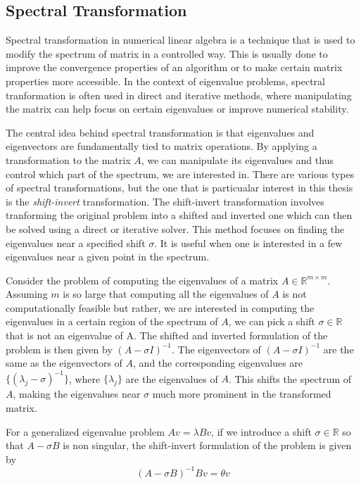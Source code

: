 \subsection{Spectral Transformation}
Spectral transformation in numerical linear algebra is a technique that is used to modify the spectrum of matrix in a controlled way. This is usually done to improve the convergence properties of an algorithm or to make certain matrix properties more accessible. In the context of eigenvalue problems, spectral tranformation is often used in direct and iterative methods, where manipulating the matrix can help focus on certain eigenvalues or improve numerical stability.\par
The central idea behind spectral transformation is that eigenvalues and eigenvectors are fundamentally tied to matrix operations. By applying a transformation to the matrix $A$, we can manipulate its eigenvalues and thus control which part of the spectrum, we are interested in. There are various types of spectral transformations, but the one that is particualar interest in this thesis is the \textit{shift-invert} transformation. The shift-invert transformation involves tranforming the original problem into a shifted and inverted one which can then be solved using a direct or iterative solver. This method focuses on finding the eigenvalues near a specified shift $\sigma$. It is useful when one is interested in a few eigenvalues near a given point in the spectrum.\par
Consider the problem of computing the eigenvalues of a matrix $A \in \mathbb{R}^{m \times m}$. Assuming $m$ is so large that computing all the eigenvalues of $A$ is not computationally feasible but rather, we are interested in computing the eigenvalues in a certain region of the spectrum of $A$, we can pick a shift $\sigma \in \mathbb{R}$ that is not an eigenvalue of A. The shifted and inverted formulation of the problem is then given by $(A - \sigma I)^{-1}$. The eigenvectors of $(A - \sigma I)^{-1}$ are the same as the eigenvectors of $A$, and the corresponding eigenvalues are $\{ (\lambda_j - \sigma)^{-1}\}$, where $\{ \lambda_j\}$ are the eigenvalues of $A$. This shifts the spectrum of $A$, making the eigenvalues near $\sigma$ much more prominent in the transformed matrix.\par
For a generalized eigenvalue problem $Av = \lambda Bv$, if we introduce a shift $\sigma \in \mathbb{R}$ so that $A - \sigma B$ is non singular, the shift-invert formulation of the problem is given by
\begin{equation}\label{st-1}
	(A - \sigma B)^{-1} Bv = \theta v
\end{equation}
